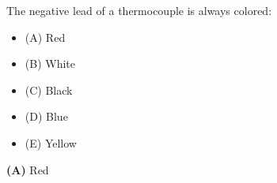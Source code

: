 

The negative lead of a thermocouple is always colored:

\begin{itemize}
\item{(A)} Red
\vskip 5pt 
\item{(B)} White
\vskip 5pt 
\item{(C)} Black
\vskip 5pt 
\item{(D)} Blue
\vskip 5pt 
\item{(E)} Yellow
\end{itemize}







{\bf (A)} Red
 









